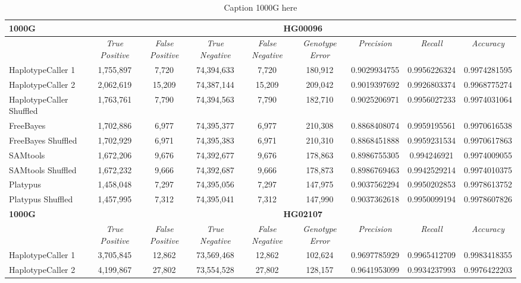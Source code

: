\begin{table}[htb]
\caption{Caption 1000G here}
\begin{center}
\begin{tabular}{|l||c|c|c|c|c|c|c|c|}
\hline
{\bf 1000G} & \multicolumn{8}{|c|}{\bf HG00096} \\
\hline
\cline{2-8}
{\bf} & {\it True Positive} & {\it False Positive} & {\it True Negative} & {\it False Negative} & {\it Genotype Error} & {\it Precision} & {\it Recall} & {\it Accuracy}\\
\hline
HaplotypeCaller 1 & 1,755,897 & 7,720 & 74,394,633 & 7,720 & 180,912 & 0.9029934755 & 0.9956226324 & 0.9974281595 \\
\hline
HaplotypeCaller 2 & 2,062,619 & 15,209 & 74,387,144 & 15,209 & 209,042 & 0.9019397692 & 0.9926803374 & 0.9968775274 \\
\hline
HaplotypeCaller Shuffled & 1,763,761 & 7,790 & 74,394,563 & 7,790 & 182,710 & 0.9025206971 & 0.9956027233 & 0.9974031064 \\
\hline
FreeBayes & 1,702,886 & 6,977 & 74,395,377 & 6,977 & 210,308 & 0.8868408074 & 0.9959195561 & 0.9970616538 \\
\hline
FreeBayes Shuffled & 1,702,929 & 6,971 & 74,395,383 & 6,971 & 210,310 & 0.8868451888 & 0.9959231534 & 0.9970617863 \\
\hline
SAMtools & 1,672,206 & 9,676 & 74,392,677 & 9,676 & 178,863 & 0.8986755305 & 0.994246921 & 0.9974009055 \\
\hline
SAMtools Shuffled & 1,672,232 & 9,666 & 74,392,687 & 9,666 & 178,873 & 0.8986769463 & 0.9942529214 & 0.9974010375 \\
\hline
Platypus & 1,458,048 & 7,297 & 74,395,056 & 7,297 & 147,975 & 0.9037562294 & 0.9950202853 & 0.9978613752 \\
\hline
Platypus Shuffled & 1,457,995 & 7,312 & 74,395,041 & 7,312 & 147,990 & 0.9037362618 & 0.9950099194 & 0.9978607826 \\
\hline
\hline
{\bf 1000G} & \multicolumn{8}{|c|}{\bf HG02107} \\
\hline
\cline{2-8}
{\bf} & {\it True Positive} & {\it False Positive} & {\it True Negative} & {\it False Negative} & {\it Genotype Error} & {\it Precision} & {\it Recall} & {\it Accuracy}\\
\hline
HaplotypeCaller 1 & 3,705,845 & 12,862 & 73,569,468 & 12,862 & 102,624 & 0.9697785929 & 0.9965412709 & 0.9983418355 \\
\hline
HaplotypeCaller 2 & 4,199,867 & 27,802 & 73,554,528 & 27,802 & 128,157 & 0.9641953099 & 0.9934237993 & 0.9976422203 \\

\end{tabular}
\end{center}
\end{table}
